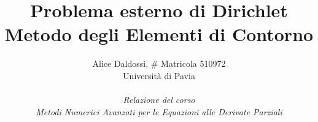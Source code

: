 \documentclass[a4paper]{article}
\theoremstyle{definition}
\theoremstyle{plain}
\theoremstyle{remark}
\begin{document}
	\title{\textbf{Problema esterno di Dirichlet} \\ Metodo degli Elementi di Contorno}
	\author{Alice Daldossi, \# Matricola 510972\\ Universit\`a di Pavia\\ \\ \textit{Relazione del corso} \\ \textit{Metodi Numerici Avanzati per le Equazioni alle Derivate Parziali}}
	\date{}
	\maketitle
	


	
\end{document}
